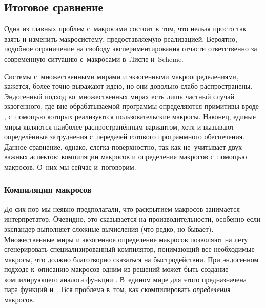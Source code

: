 \subsection{Итоговое сравнение}\label{macros/define/ssect:comparison}

Одна из главных проблем с~макросами состоит в~том, что нельзя просто так взять
и изменить макросистему, предоставляемую реализацией. Вероятно, подобное
ограничение на свободу экспериментирования отчасти ответственно за современную
ситуацию с~макросами в~Лиспе и~Scheme.

Системы с~множественными мирами и экзогенными макроопределениями, кажется, более
точно выражают идею, но они довольно слабо распространены. Эндогенный подход
во~множественных мирах есть лишь частный случай экзогенного, где вне
обрабатываемой программы определяются примитивы вроде 
{\itd}, с~помощью которых реализуются пользовательские макросы. Наконец, единые
миры являются наиболее распространённым вариантом, хотя и вызывают определённые
затруднения с~передачей готового программного обеспечения. Данное сравнение,
однако, слегка поверхностно, так как не~учитывает двух важных аспектов:
компиляции макросов и определения макросов с~помощью макросов. О~них мы сейчас
и~поговорим.


\subsubsection{Компиляция макросов}%
\label{macros/define/comparison/sssect:compiling}

До сих пор мы неявно предполагали, что раскрытием макросов занимается
интерпретатор. Очевидно, это сказывается на производительности, особенно если
экспандер выполняет сложные вычисления (что редко, но бывает). Множественные
миры и экзогенное определение макросов 
позволяют на лету сгенерировать специализированный компилятор, понимающий все
необходимые макросы, что должно благотворно сказаться на быстродействии. При
эндогенном подходе к~описанию макросов одним из решений может быть создание
компилирующего аналога функции . В~едином мире для этого
предназначена пара функций  и~. Вся проблема в~том,
как скомпилировать \emph{определения} макросов.

